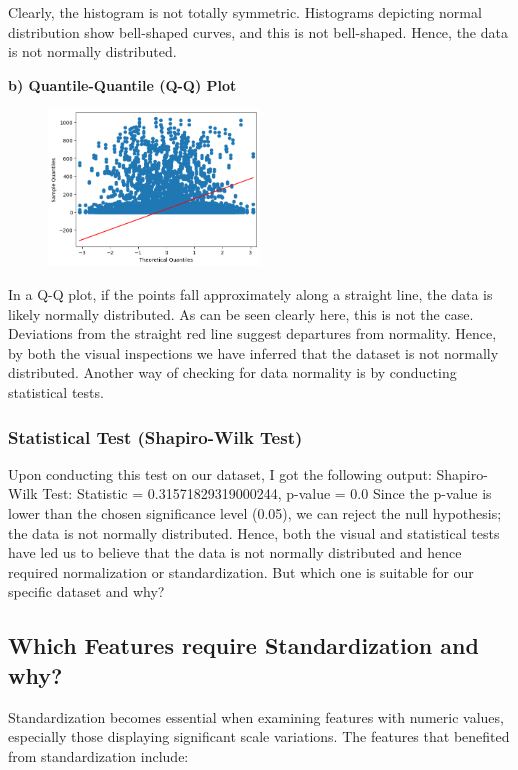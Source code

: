 Clearly, the histogram is not totally symmetric. Histograms depicting normal distribution show bell-shaped curves, and this is not bell-shaped. Hence, the data is not normally distributed.

\textbf{b) Quantile-Quantile (Q-Q) Plot} 
\newline 
\begin{figure}[h]
    \centering
    \includegraphics[width=0.5\textwidth]{Chapters/ch2/ch_2_scatter_plot_1.png}
\end{figure}

In a Q-Q plot, if the points fall approximately along a straight line, the data is likely normally distributed. As can be seen clearly here, this is not the case. Deviations from the straight red line suggest departures from normality. 
\newline
Hence, by both the visual inspections we have inferred that the dataset is not normally distributed. 
Another way of checking for data normality is by conducting statistical tests. 

\subsubsection{Statistical Test (Shapiro-Wilk Test) }
Upon conducting this test on our dataset, I got the following output: 
\newline
Shapiro-Wilk Test: Statistic = 0.31571829319000244, p-value = 0.0
\newline
Since the p-value is lower than the chosen significance level (0.05), we can reject the null hypothesis; the data is not normally distributed.
\newline
Hence, both the visual and statistical tests have led us to believe that the data is not normally distributed and hence required normalization or standardization. But which one is suitable for our specific dataset and why?

\subsection{Which Features require Standardization and why?}
Standardization becomes essential when examining features with numeric values, especially those displaying significant scale variations. The features that benefited from standardization include:


